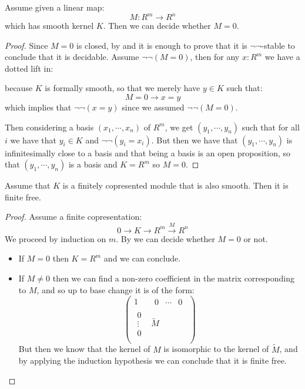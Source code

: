 \begin{lemma}\label{smooth-kernel-decidable}
Assume given a linear map:
\[M:R^m\to R^n\] 
which has smooth kernel $K$. Then we can decide whether $M=0$.
\end{lemma}

\begin{proof}
Since $M=0$ is closed, by  and  it is enough to prove that it is $\neg\neg$-stable to conclude that it is decidable. Assume $\neg\neg(M=0)$, then for any $x:R^m$ we have a dotted lift in:
 \begin{center}
\end{center}
because $K$ is formally smooth, so that we merely have $y\in K$ such that: 
\[M=0\to x=y\]
which implies that $\neg\neg(x=y)$ since we assumed $\neg\neg(M=0)$.

Then considering a basis $(x_1,\cdots,x_n)$ of $R^m$, we get $(y_1,\cdots,y_n)$ such that for all $i$ we have that $y_i\in K$ and $\neg\neg(y_i=x_i)$. But then we have that $(y_1,\cdots,y_n)$ is infinitesimally close to a basis and that being a basis is an open proposition, so that $(y_1,\cdots,y_n)$ is a basis and $K=R^m$ so $M=0$.
\end{proof}

\begin{lemma}\label{smooth-corpresented-implies-free}
Assume that $K$ is a finitely copresented module that is also smooth. Then it is finite free.
\end{lemma}

\begin{proof}
Assume a finite copresentation:
\[0\to K\to R^m\overset{M}{\to} R^n\]
We proceed by induction on $m$. By  we can decide whether $M=0$ or not.
\begin{itemize}
\item If $M=0$ then $K=R^m$ and we can conclude.
\item If $M\not=0$ then we can find a non-zero coefficient in the matrix corresponding to $M$, and so up to base change it is of the form:
\[
\begin{pmatrix}
1 & \begin{matrix}0&\cdots & 0\end{matrix}  \\
\begin{matrix}0\\ \vdots\\ 0\end{matrix} & \widetilde{M} \\
\end{pmatrix}
\]
But then we know that the kernel of $M$ is isomorphic to the kernel of $\widetilde{M}$, and by applying the induction hypothesis we can conclude that it is finite free.
\end{itemize}
\end{proof}

